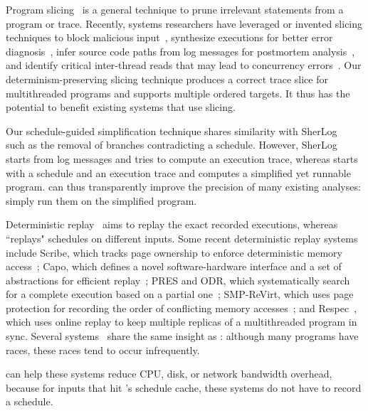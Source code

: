   Program slicing~\cite{Tip:slicing} is a general
technique to prune irrelevant statements from a program or trace.
Recently, systems researchers have leveraged or invented slicing
techniques to block malicious input~\cite{castro:bouncer}, synthesize
executions for better error diagnosis~\cite{esd:eurosys10}, infer source
code paths from log messages for postmortem
analysis~\cite{sherlog:asplos10}, and identify critical inter-thread reads
that may lead to concurrency errors~\cite{conseq:asplos11}.  
Our determinism-preserving slicing technique produces a correct trace slice for
multithreaded programs and supports multiple ordered targets.  It thus has
the potential to benefit existing systems that use slicing.  

Our schedule-guided simplification technique shares similarity with
SherLog~\cite{sherlog:asplos10} such as the removal of branches
contradicting a schedule.  However, SherLog starts from log messages and
tries to compute an execution trace, whereas \peregrine starts with a schedule
and an execution trace and computes a simplified yet runnable program.
\peregrine can thus transparently improve the precision of many existing
analyses: simply run them on the simplified program.


  Deterministic
replay~\cite{r2:osdi, friday2007, srinivasan:flashback, revirt, dejavu, 
vmware-record-replay, smp-revirt:vee08, pres:sosp09, scribe:sigmetrics10, 
odr:sosp09, capo:asplos09} aims to replay the exact recorded executions, 
whereas \peregrine ``replays" schedules on different inputs.  Some recent 
deterministic replay systems include Scribe, which tracks page ownership to 
enforce deterministic memory access~\cite{scribe:sigmetrics10}; Capo, which 
defines a novel software-hardware interface and a set of abstractions for 
efficient
replay~\cite{capo:asplos09}; PRES and ODR, which systematically search for
a complete execution based on a partial one~\cite{pres:sosp09, odr:sosp09};
SMP-ReVirt, which uses page protection for recording the
order of conflicting memory accesses~\cite{smp-revirt:vee08}; and
Respec~\cite{respec:asplos10}, which uses online replay to keep multiple
replicas of a multithreaded program in sync.  Several
systems~\cite{pres:sosp09,respec:asplos10} share the same insight as \peregrine:
although many programs have races, these races tend to occur infrequently.

\peregrine can help these systems reduce CPU, disk, or network bandwidth
overhead, because for inputs that hit \peregrine's schedule cache, these systems
do not have to record a schedule.

